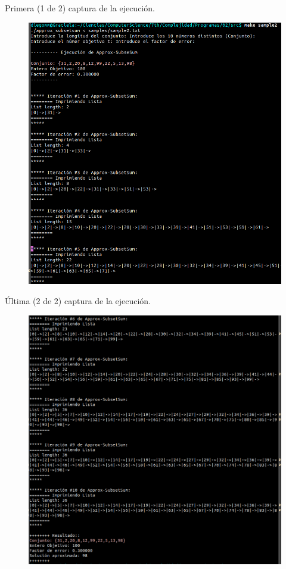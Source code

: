 \documentclass[14pt,letterpaper]{article}
\begin{document}
Primera (1 de 2) captura de la ejecución.

  \begin{figure}[h]
    \includegraphics[width=15cm]{sample2_1.png}
    \centering
  \end{figure}

  \clearpage
  Última (2 de 2) captura de la ejecución.
  \begin{figure}[h]
    \includegraphics[width=15cm]{sample2_2.png}
    \centering
  \end{figure}
  \clearpage
\end{document}
